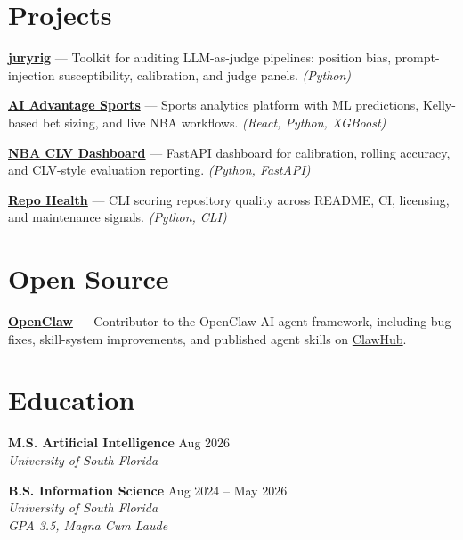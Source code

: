 \documentclass[11pt,letterpaper]{article}
\begin{document}
\section{Projects}

\textbf{\href{https://github.com/ianalloway/juryrig}{juryrig}} --- Toolkit for auditing LLM-as-judge pipelines: position bias, prompt-injection susceptibility, calibration, and judge panels. \textit{(Python)}

\vspace{3pt}

\textbf{\href{https://aiadvantagesports.com}{AI Advantage Sports}} --- Sports analytics platform with ML predictions, Kelly-based bet sizing, and live NBA workflows. \textit{(React, Python, XGBoost)}

\vspace{3pt}

\textbf{\href{https://github.com/ianalloway/nba-clv-dashboard}{NBA CLV Dashboard}} --- FastAPI dashboard for calibration, rolling accuracy, and CLV-style evaluation reporting. \textit{(Python, FastAPI)}

\vspace{3pt}

\textbf{\href{https://github.com/ianalloway/repo-health}{Repo Health}} --- CLI scoring repository quality across README, CI, licensing, and maintenance signals. \textit{(Python, CLI)}

\section{Open Source}
\textbf{\href{https://github.com/openclaw/openclaw}{OpenClaw}} --- Contributor to the OpenClaw AI agent framework, including bug fixes, skill-system improvements, and published agent skills on \href{https://clawhub.ai}{ClawHub}.

\section{Education}

\textbf{M.S. Artificial Intelligence} \hfill Aug 2026 \\
\textit{University of South Florida}

\vspace{3pt}

\textbf{B.S. Information Science} \hfill Aug 2024 -- May 2026 \\
\textit{University of South Florida} \\
\textit{GPA 3.5, Magna Cum Laude}
\end{document}
